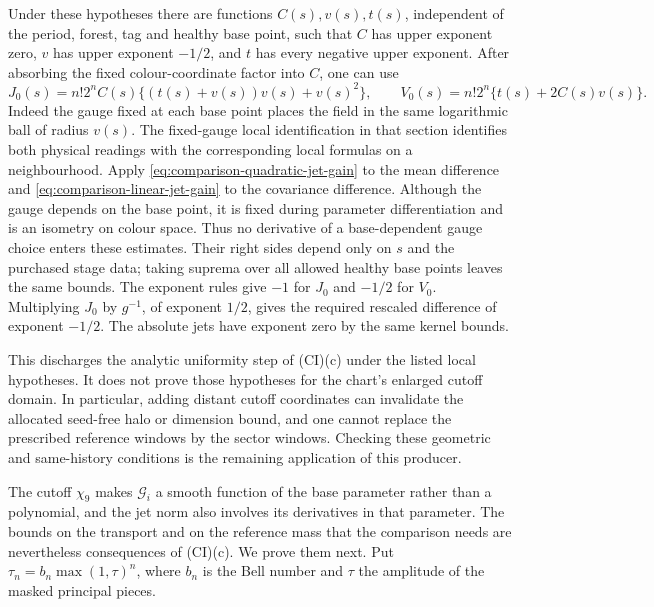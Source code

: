 Under these hypotheses there are functions $C(s),v(s),t(s)$, independent
of the period, forest, tag and healthy base point, such that $C$ has
upper exponent zero, $v$ has upper exponent $-1/2$, and $t$ has every
negative upper exponent. After absorbing the fixed colour-coordinate
factor into $C$, one can use
\begin{equation}\label{eq:allarity-uniform-primitive-supplier}
 J_0(s)=n!2^n C(s)\{(t(s)+v(s))v(s)+v(s)^2\},\qquad
 V_0(s)=n!2^n\{t(s)+2C(s)v(s)\}.
\end{equation}
Indeed the gauge fixed at each base point places the field in the
same logarithmic ball of radius $v(s)$. The fixed-gauge local
identification in that section identifies both physical readings with
the corresponding local formulas on a neighbourhood. Apply
\eqref{eq:comparison-quadratic-jet-gain} to the mean difference and
\eqref{eq:comparison-linear-jet-gain} to the covariance difference.
Although the gauge depends on the base point, it is fixed during
parameter differentiation and is an isometry on colour space. Thus
no derivative of a base-dependent gauge choice enters these estimates.
Their right sides depend only on $s$ and the purchased stage data;
taking suprema over all allowed healthy base points leaves the same
bounds. The exponent rules give $-1$ for $J_0$ and $-1/2$ for $V_0$.
Multiplying $J_0$ by $g^{-1}$, of exponent $1/2$, gives the required
rescaled difference of exponent $-1/2$. The absolute jets have
exponent zero by the same kernel bounds.

This discharges the analytic uniformity step of (CI)(c) under the
listed local hypotheses. It does not prove those hypotheses for the
chart's enlarged cutoff domain. In particular, adding distant cutoff
coordinates can invalidate the allocated seed-free halo or dimension
bound, and one cannot replace the prescribed reference windows by the
sector windows. Checking these geometric and same-history conditions
is the remaining application of this producer.

The cutoff $\chi_9$ makes $\mathcal G_i$ a smooth function of the base
parameter rather than a polynomial, and the jet norm also involves its
derivatives in that parameter. The bounds on the transport and on the
reference mass that the comparison needs are nevertheless consequences of
(CI)(c). We prove them next. Put $\tau_n=b_n\max(1,\tau)^n$, where $b_n$
is the Bell number and $\tau$ the amplitude of the masked principal
pieces.

